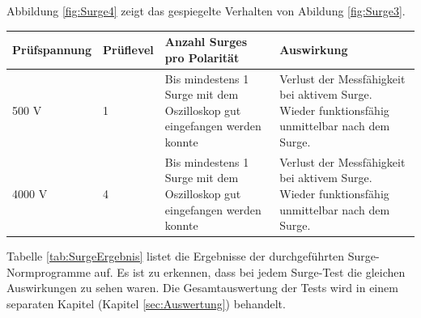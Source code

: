 Abbildung \ref{fig:Surge4} zeigt das gespiegelte Verhalten von Abildung \ref{fig:Surge3}.\\[0.5cm]
\begin{tabular}{|l|l|p{5cm}|p{5cm}|}
\hline 
\rule[-1ex]{0pt}{2.5ex} Prüfspannung & Prüflevel & Anzahl Surges pro Polarität & Auswirkung \\ 
\hline 
\rule[-1ex]{0pt}{2.5ex} 500 V & 1 & Bis mindestens 1 Surge mit dem Oszilloskop gut eingefangen werden konnte & Verlust der Messfähigkeit bei aktivem Surge. Wieder funktionsfähig unmittelbar nach dem Surge. \\ 
\hline 
\rule[-1ex]{0pt}{2.5ex} 4000 V & 4 & Bis mindestens 1 Surge mit dem Oszilloskop gut eingefangen werden konnte & Verlust der Messfähigkeit bei aktivem Surge. Wieder funktionsfähig unmittelbar nach dem Surge. \\ 
\hline 
\end{tabular} 
\label{tab:SurgeErgebnis}
\vspace*{0.25cm}
Tabelle \ref{tab:SurgeErgebnis} listet die Ergebnisse der durchgeführten Surge-Normprogramme auf. Es ist zu erkennen, dass bei jedem Surge-Test die gleichen Auswirkungen zu sehen waren. Die Gesamtauswertung der Tests wird in einem separaten Kapitel (Kapitel \ref{sec:Auswertung}) behandelt.\\
